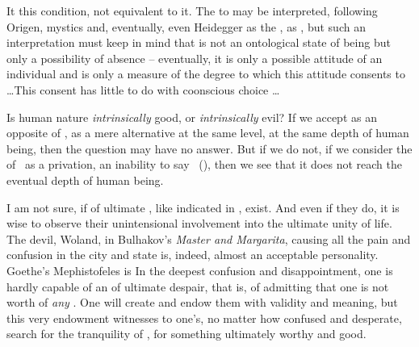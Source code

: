 {\say {}  It  this condition, not equivalent to
it. The  to  may be interpreted, 
following Origen, mystics and, eventually, even Heidegger as the 
, as , but such an interpretation must 
keep in mind that  is not an ontological state of 
being but only a possibility of  absence -- eventually, 
it is only a possible attitude of an individual and  is only 
a measure of the degree to which this attitude consents to 
\ldots This consent has little to do with coonscious 
choice \ldots


\pa
Is human nature {\em intrinsically} good, or {\em intrinsically}
evil? 
If we accept  as an opposite of , as a mere 
alternative at the same level, at the same depth of human being, then 
the question may have no answer. 
But if we do not, if we consider the  of \No\ as a 
privation, an inability to say \yes\ (),  
then we see that it does not reach the eventual depth of human being. 


\pa\label{pa:noevil}
I am not sure, if  of ultimate ,  like 
indicated in , exist. And even if they do, it is 
wise to observe their unintensional involvement into the ultimate 
unity of life. The devil, Woland, in Bulhakov's {\em Master and 
Margarita}, causing all the pain and confusion in the  
city and state is, indeed, almost an acceptable personality. Goethe's 
Mephistofeles is  In the deepest confusion and disappointment, one is 
hardly capable of an  of ultimate despair, that is, of 
admitting that one is not worth of {\em any} .
One will create  and endow them with 
 validity and meaning, but this very endowment witnesses 
to one's, no matter how confused and desperate, search for the 
tranquility of , for something ultimately 
worthy and good. 


}

